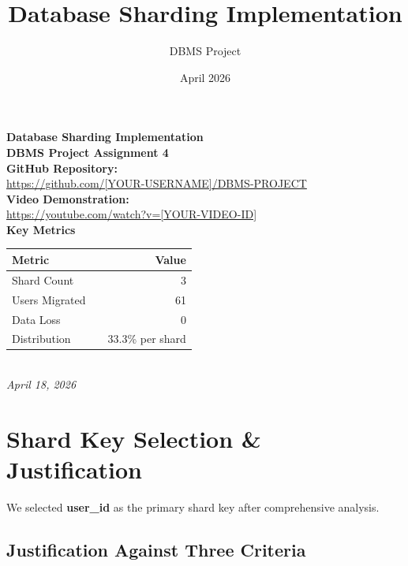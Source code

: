 \documentclass[11pt,a4paper]{article}
\title{\textbf{\Large Database Sharding Implementation}}
\author{DBMS Project}
\date{April 2026}
\begin{document}
\thispagestyle{empty}
\begin{center}
    \vspace*{1cm}
    {\huge \textbf{Database Sharding Implementation}}\\[0.3cm]
    
    \textbf{DBMS Project Assignment 4}\\[2cm]
    
    {\large \textbf{GitHub Repository:}}\\
    {\small \url{https://github.com/[YOUR-USERNAME]/DBMS-PROJECT}}\\[1cm]
    
    {\large \textbf{Video Demonstration:}}\\
    {\small \url{https://youtube.com/watch?v=[YOUR-VIDEO-ID]}}\\[2cm]
    
    {\large \textbf{Key Metrics}}\\
    \begin{tabular}{lcr}
        \toprule
        \textbf{Metric} & & \textbf{Value} \\
        \midrule
        Shard Count & & 3 \\
        Users Migrated & & 61 \\
        Data Loss & & 0 \\
        Distribution & & 33.3\% per shard \\
        \bottomrule
    \end{tabular}\\[2cm]
    
    \textit{April 18, 2026}
\end{center}

\newpage

\section{Shard Key Selection \& Justification}

We selected \textbf{user\_id} as the primary shard key after comprehensive analysis.

\subsection*{Justification Against Three Criteria}
\end{document}
